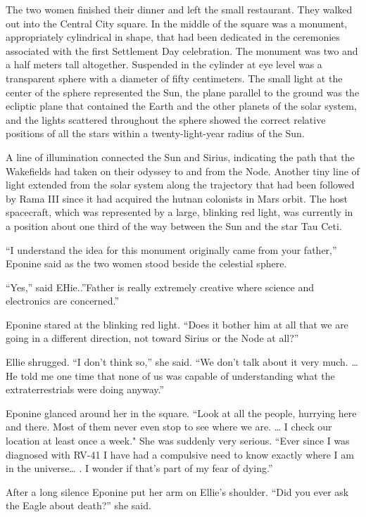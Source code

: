 \documentclass[]{article}
\begin{document}
{The two women finished their dinner and left the small restaurant.  They walked out into the Central City square.  In the middle of the square was a monument, appropriately cylindrical in shape, that had been dedicated in the ceremonies associated with the first Settlement Day celebration.  The monument was two and a half meters tall altogether.  Suspended in the cylinder at eye level was a transparent sphere with a diameter of fifty centimeters.  The small light at the center of the sphere represented the Sun, the plane parallel to the ground was the ecliptic plane that contained the Earth and the other planets of the solar system, and the lights scattered throughout the sphere showed the correct relative positions of all the stars within a twenty-light-year radius of the Sun.

A line of illumination connected the Sun and Sirius, indicating the path that the Wakefields had taken on their odyssey to and from the Node.  Another tiny line of light extended from the solar system along the trajectory that had been followed by Rama III since it had acquired the hutnan colonists in Mars orbit.  The host spacecraft, which was represented by a large, blinking red light, was currently in a position about one third of the way between the Sun and the star Tau Ceti.

“I understand the idea for this monument originally came from your father,” Eponine said as the two women stood beside the celestial sphere.

“Yes,” said EHie..”Father is really extremely creative where science and electronics are concerned.”

Eponine stared at the blinking red light.  “Does it bother him at all that we are going in a different direction, not toward Sirius or the Node at all?”

Ellie shrugged.  “I don’t think so,” she said.  “We don’t talk about it very much.  … He told me one time that none of us was capable of understanding what the extraterrestrials were doing anyway.”

Eponine glanced around her in the square.  “Look at all the people, hurrying here and there.  Most of them never even stop to see where we are.  … I check our location at least once a week."  She was suddenly very serious.  “Ever since I was diagnosed with RV-41 I have had a compulsive need to know exactly where I am in the universe… .  I wonder if that’s part of my fear of dying.”

After a long silence Eponine put her arm on Ellie’s shoulder.  “Did you ever ask the Eagle about death?” she said.

}
\end{document}
